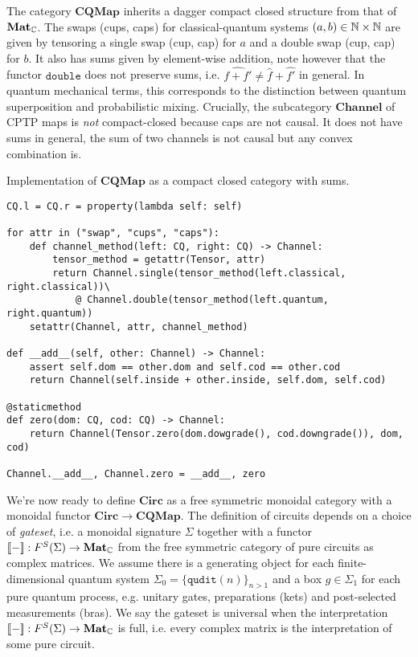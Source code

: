 The category $\mathbf{CQMap}$ inherits a dagger compact closed structure from that of $\mathbf{Mat}_{\mathbb{C}}$.
The swaps (cups, caps) for classical-quantum systems $(a, b) \in \mathbb{N} \times \mathbb{N}$ are given by tensoring a single swap (cup, cap) for $a$ and a double swap (cup, cap) for $b$.
It also has sums given by element-wise addition, note however that the functor $\mathtt{double}$ does not preserve sums, i.e. $\widehat{f + f'} \neq \widehat{f} + \widehat{f'}$ in general.
In quantum mechanical terms, this corresponds to the distinction between
quantum superposition and probabilistic mixing.
Crucially, the subcategory $\mathbf{Channel}$ of CPTP maps is \emph{not} compact-closed because caps are not causal.
It does not have sums in general, the sum of two channels is not causal but any convex combination is.

\begin{python}
{\normalfont Implementation of $\mathbf{CQMap}$ as a compact closed category with sums.}

\begin{verbatim}
CQ.l = CQ.r = property(lambda self: self)

for attr in ("swap", "cups", "caps"):
    def channel_method(left: CQ, right: CQ) -> Channel:
        tensor_method = getattr(Tensor, attr)
        return Channel.single(tensor_method(left.classical, right.classical))\
            @ Channel.double(tensor_method(left.quantum, right.quantum))
    setattr(Channel, attr, channel_method)

def __add__(self, other: Channel) -> Channel:
    assert self.dom == other.dom and self.cod == other.cod
    return Channel(self.inside + other.inside, self.dom, self.cod)

@staticmethod
def zero(dom: CQ, cod: CQ) -> Channel:
    return Channel(Tensor.zero(dom.dowgrade(), cod.downgrade()), dom, cod)

Channel.__add__, Channel.zero = __add__, zero
\end{verbatim}
\end{python}

We're now ready to define $\mathbf{Circ}$ as a free symmetric monoidal category with a monoidal functor $\mathbf{Circ} \to \mathbf{CQMap}$.
The definition of circuits depends on a choice of \emph{gateset}, i.e. a monoidal signature $\Sigma$ together with a functor $[\![-]\!] : F^S(\Sigma) \to \mathbf{Mat}_{\mathbb{C}}$ from the free symmetric category of pure circuits as complex matrices.
We assume there is a generating object for each finite-dimensional quantum system $\Sigma_0 = \{ \mathtt{qudit}(n) \}_{n > 1}$ and a box $g \in \Sigma_1$ for each pure quantum process, e.g. unitary gates, preparations (kets) and post-selected measurements (bras).
We say the gateset is universal when the interpretation $[\![-]\!] : F^S(\Sigma) \to \mathbf{Mat}_{\mathbb{C}}$ is full, i.e. every complex matrix is the interpretation of some pure circuit.

